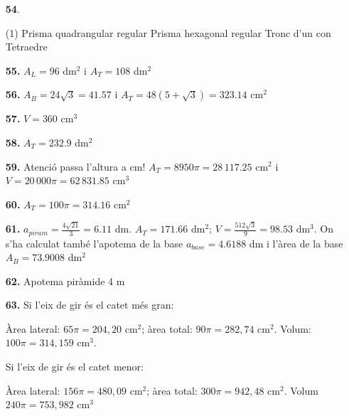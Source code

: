 \documentclass[a4paper, pdf, twoside]{book}
\begin{document}
\begin{multicols}{2}
\begin{enumerate}
 \item[\fontfamily{phv}\selectfont\color{blue}\textbf{54}. ] 
 \begin{tasks}[column-sep=1em, item-indent=1.3333em](1)
	 \task Prisma quadrangular regular
	 \task Prisma hexagonal regular
	 \task Tronc d'un con
	 \task Tetraedre
\end{tasks}
 \end{enumerate}
\begin{enumerate}
\vspace{0.25cm}
\item[\fontfamily{phv}\selectfont\color{blue}\textbf{55. }] 
$A_L=96$ dm$^2$ i $A_T=108$ dm$^2$
\vspace{0.25cm}
\item[\fontfamily{phv}\selectfont\color{blue}\textbf{56. }] 
$A_B=24\sqrt {3}=41.57$ i $A_T=48(5+\sqrt {3})=323.14$ cm$^2$
\vspace{0.25cm}
\item[\fontfamily{phv}\selectfont\color{blue}\textbf{57. }] 
$V=360$ cm$^3$
\vspace{0.25cm}
\item[\fontfamily{phv}\selectfont\color{blue}\textbf{58. }] 
$A_T=232.9$ dm$^2$
\vspace{0.25cm}
\item[\fontfamily{phv}\selectfont\color{blue}\textbf{59. }] 
Atenció passa l'altura a cm! $A_T=8950\pi =28\,117.25$ cm$^2$ i $V=20\,000\pi =62\,831.85$ cm$^3$
\vspace{0.25cm}
\item[\fontfamily{phv}\selectfont\color{blue}\textbf{60. }] 
$A_T=100\pi =314.16$ cm$^2$
\vspace{0.25cm}
\item[\fontfamily{phv}\selectfont\color{blue}\textbf{61. }] 
$a_{piram}=\frac {4\sqrt {21}}{3}=6.11$ dm. $A_T=171.66$ dm$^2$; $V=\frac {512\sqrt {3}}{9}=98.53$ dm$^3$. On s'ha calculat també l'apotema de la base $a_{base}=4.6188$ dm i l'àrea de la base $A_B=73.9008$ dm$^2$
\vspace{0.25cm}
\item[\fontfamily{phv}\selectfont\color{blue}\textbf{62. }]  \scalebox{0.6}{\simbolclau } 
Apotema piràmide 4 m
\vspace{0.25cm}
\item[\fontfamily{phv}\selectfont\color{blue}\textbf{63. }] 
 Si l'eix de gir és el catet més gran:\par Àrea lateral: $65\pi = 204,20$ cm$^2$; àrea total: $90\pi = 282,74$ cm$^2$. Volum: $100\pi = 314,159$ cm$^3$.\par Si l'eix de gir és el catet menor:\par Àrea lateral: $156\pi = 480,09$ cm$^2$; àrea total: $300\pi = 942,48$ cm$^2$. Volum $240\pi =753,982$ cm$^3$

\end{enumerate}
\end{multicols}
\end{document}
